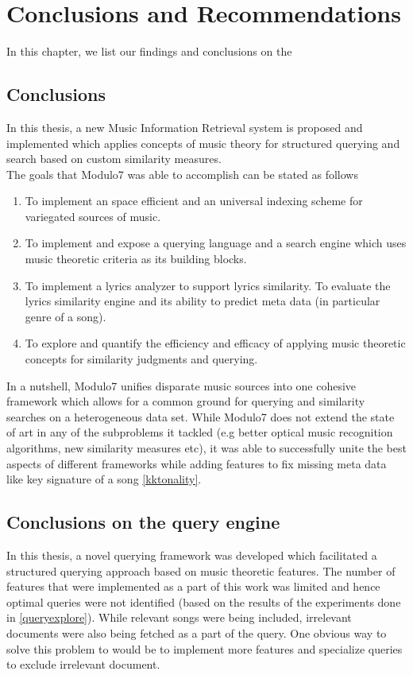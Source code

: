 \chapter{Conclusions and Recommendations}

\noindent In this chapter, we list our findings and conclusions on the 
\section{Conclusions}

\noindent In this thesis, a new Music Information Retrieval system is proposed and implemented which applies concepts of music theory for structured querying and search based on custom similarity measures. \\

\noindent The goals that Modulo7 was able to accomplish can be stated as follows
\begin{enumerate}
\item To implement an space efficient and an universal indexing scheme for variegated sources of music.
\item To implement and expose a querying language and a search engine  which uses music theoretic criteria as its building blocks. 
\item To implement a lyrics analyzer to support lyrics similarity. To evaluate the lyrics similarity engine and its ability to predict meta data (in particular genre of a song).  
\item To explore and quantify the efficiency and efficacy of applying music theoretic concepts for similarity judgments and querying.
\end{enumerate} 

\noindent In a nutshell, Modulo7 unifies disparate music sources into one cohesive framework which allows for a common ground for querying and similarity searches on a heterogeneous data set. While Modulo7 does not extend the state of art in any of the subproblems it tackled (e.g better optical music recognition algorithms, new similarity measures etc), it was able to successfully unite the best aspects of different frameworks while adding features to fix missing meta data like key signature of a song \ref{kktonality}. 

\section{Conclusions on the query engine}

\noindent In this thesis, a novel querying framework was developed which facilitated a structured querying approach based on music theoretic features. The number of features that were implemented as a part of this work was limited and hence optimal queries were not identified (based on the results of the experiments done in \ref{queryexplore}). While relevant songs were being included, irrelevant documents were also being fetched as a part of the query. One obvious way to solve this problem to would be to implement more features and specialize queries to exclude irrelevant document. 

